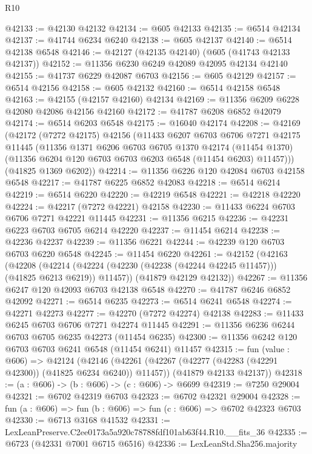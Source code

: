 \begin{lexlean}{R10}
\begin{coremodule}
@42133 := @42130 @42132
@42134 := @605 @42133
@42135 := @6514 @42134
@42137 := @41744 @6234 @6240
@42138 := @605 @42137
@42140 := @6514 @42138 @6548
@42146 := @42127 (@42135 @42140) (@605 (@41743 @42133 @42137))
@42152 := @11356 @6230 @6249 @42089 @42095 @42134 @42140
@42155 := @41737 @6229 @42087 @6703
@42156 := @605 @42129
@42157 := @6514 @42156
@42158 := @605 @42132
@42160 := @6514 @42158 @6548
@42163 := @42155 (@42157 @42160) @42134
@42169 := @11356 @6209 @6228 @42080 @42086 @42156 @42160
@42172 := @41787 @6208 @6852 @42079
@42174 := @6514 @6203 @6548
@42175 := @16040 @42174
@42208 := @42169
    (@42172
      (@7272 @42175)
      @42156
      (@11433
        @6207
        @6703
        @6706
        @7271
        @42175
        @11445
        (@11356
          @1371
          @6206
          @6703
          @6705
          @1370
          @42174
          (@11454 @1370)
          (@11356 @6204 @120 @6703 @6703 @6203 @6548 (@11454 @6203) @11457)))
      (@41825 @1369 @6202))
@42214 := @11356 @6226 @120 @42084 @6703 @42158 @6548
@42217 := @41787 @6225 @6852 @42083
@42218 := @6514 @6214
@42219 := @6514 @6220
@42220 := @42219 @6548
@42221 := @42218 @42220
@42224 := @42217 (@7272 @42221) @42158
@42230 := @11433 @6224 @6703 @6706 @7271 @42221 @11445
@42231 := @11356 @6215
@42236 := @42231 @6223 @6703 @6705 @6214 @42220
@42237 := @11454 @6214
@42238 := @42236 @42237
@42239 := @11356 @6221
@42244 := @42239 @120 @6703 @6703 @6220 @6548
@42245 := @11454 @6220
@42261 := @42152
    (@42163
      (@42208
        (@42214 (@42224 (@42230 (@42238 (@42244 @42245 @11457))) (@41825 @6213 @6219)) @11457))
      (@41879 @42129 @42132))
@42267 := @11356 @6247 @120 @42093 @6703 @42138 @6548
@42270 := @41787 @6246 @6852 @42092
@42271 := @6514 @6235
@42273 := @6514 @6241 @6548
@42274 := @42271 @42273
@42277 := @42270 (@7272 @42274) @42138
@42283 := @11433 @6245 @6703 @6706 @7271 @42274 @11445
@42291 := @11356 @6236 @6244 @6703 @6705 @6235 @42273 (@11454 @6235)
@42300 := @11356 @6242 @120 @6703 @6703 @6241 @6548 (@11454 @6241) @11457
@42315 := fun (value : @606) =>
  @42124
    (@42146
      (@42261 (@42267 (@42277 (@42283 (@42291 @42300)) (@41825 @6234 @6240)) @11457))
      (@41879 @42133 @42137))
@42318 := (a : @606) -> (b : @606) -> (c : @606) -> @6699
@42319 := @7250 @29004
@42321 := @6702 @42319 @6703
@42323 := @6702 @42321 @29004
@42328 := fun (a : @606) => fun (b : @606) => fun (c : @606) => @6702 @42323 @6703
@42330 := @6713 @3168 @41532
@42331 := LexLeanPreserve.C2ee0173a5a920c78788fdf101ab63f44.R10.__fits_36
@42335 := @6723 (@42331 @7001 @6715 @6516)
@42336 := LexLeanStd.Sha256.majority

\end{coremodule}
\end{lexlean}
